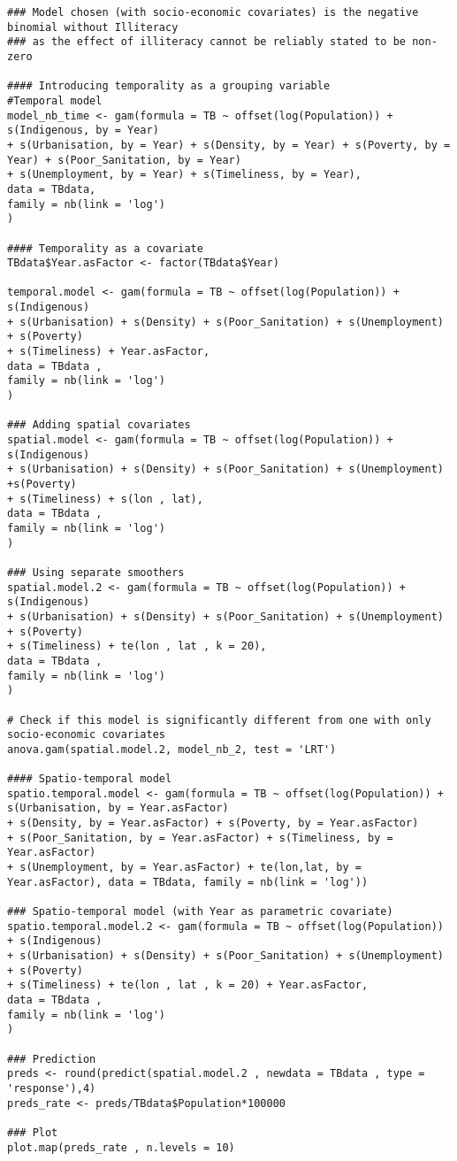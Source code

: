 \begin{verbatim}
### Model chosen (with socio-economic covariates) is the negative binomial without Illiteracy
### as the effect of illiteracy cannot be reliably stated to be non-zero

#### Introducing temporality as a grouping variable
#Temporal model
model_nb_time <- gam(formula = TB ~ offset(log(Population)) + s(Indigenous, by = Year) 
+ s(Urbanisation, by = Year) + s(Density, by = Year) + s(Poverty, by = Year) + s(Poor_Sanitation, by = Year) 
+ s(Unemployment, by = Year) + s(Timeliness, by = Year), 
data = TBdata, 
family = nb(link = 'log')
)

#### Temporality as a covariate
TBdata$Year.asFactor <- factor(TBdata$Year)

temporal.model <- gam(formula = TB ~ offset(log(Population)) + s(Indigenous)
+ s(Urbanisation) + s(Density) + s(Poor_Sanitation) + s(Unemployment) + s(Poverty)
+ s(Timeliness) + Year.asFactor,
data = TBdata ,
family = nb(link = 'log')
)

### Adding spatial covariates
spatial.model <- gam(formula = TB ~ offset(log(Population)) + s(Indigenous) 
+ s(Urbanisation) + s(Density) + s(Poor_Sanitation) + s(Unemployment) +s(Poverty)
+ s(Timeliness) + s(lon , lat),
data = TBdata , 
family = nb(link = 'log')
)

### Using separate smoothers
spatial.model.2 <- gam(formula = TB ~ offset(log(Population)) + s(Indigenous) 
+ s(Urbanisation) + s(Density) + s(Poor_Sanitation) + s(Unemployment) + s(Poverty)
+ s(Timeliness) + te(lon , lat , k = 20),
data = TBdata , 
family = nb(link = 'log')
)

# Check if this model is significantly different from one with only socio-economic covariates
anova.gam(spatial.model.2, model_nb_2, test = 'LRT')

#### Spatio-temporal model
spatio.temporal.model <- gam(formula = TB ~ offset(log(Population)) + s(Urbanisation, by = Year.asFactor) 
+ s(Density, by = Year.asFactor) + s(Poverty, by = Year.asFactor) 
+ s(Poor_Sanitation, by = Year.asFactor) + s(Timeliness, by = Year.asFactor) 
+ s(Unemployment, by = Year.asFactor) + te(lon,lat, by = Year.asFactor), data = TBdata, family = nb(link = 'log'))

### Spatio-temporal model (with Year as parametric covariate)
spatio.temporal.model.2 <- gam(formula = TB ~ offset(log(Population)) + s(Indigenous) 
+ s(Urbanisation) + s(Density) + s(Poor_Sanitation) + s(Unemployment) + s(Poverty)
+ s(Timeliness) + te(lon , lat , k = 20) + Year.asFactor,
data = TBdata , 
family = nb(link = 'log')
)

### Prediction
preds <- round(predict(spatial.model.2 , newdata = TBdata , type = 'response'),4)
preds_rate <- preds/TBdata$Population*100000

### Plot
plot.map(preds_rate , n.levels = 10)
\end{verbatim}


